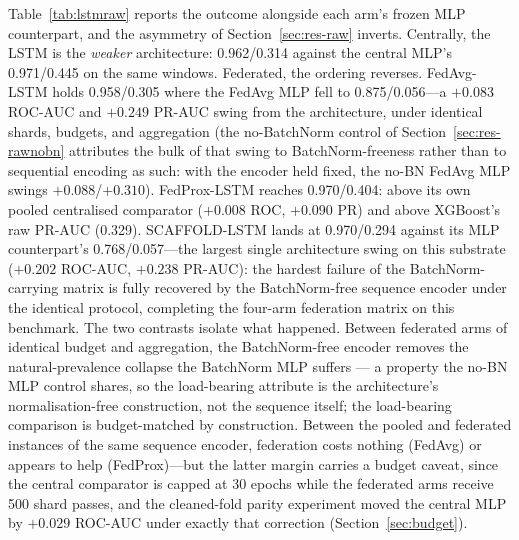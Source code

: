 Table~\ref{tab:lstmraw} reports the outcome alongside each arm's
frozen MLP counterpart, and the asymmetry of
Section~\ref{sec:res-raw} inverts. Centrally, the LSTM is the
\emph{weaker} architecture: 0.962/0.314 against the central MLP's
0.971/0.445 on the same windows. Federated, the ordering reverses.
FedAvg-LSTM holds 0.958/0.305 where the FedAvg MLP fell to
0.875/0.056---a $+0.083$ ROC-AUC and $+0.249$ PR-AUC swing from the
architecture, under identical shards, budgets, and aggregation (the
no-BatchNorm control of Section~\ref{sec:res-rawnobn} attributes the
bulk of that swing to BatchNorm-freeness rather than to sequential
encoding as such: with the encoder held fixed, the no-BN FedAvg MLP
swings $+0.088$/$+0.310$).
FedProx-LSTM reaches 0.970/0.404: above its own pooled centralised
comparator ($+0.008$ ROC, $+0.090$ PR) and above XGBoost's raw
PR-AUC (0.329). SCAFFOLD-LSTM lands at 0.970/0.294 against its MLP
counterpart's 0.768/0.057---the largest single architecture swing on
this substrate ($+0.202$ ROC-AUC, $+0.238$ PR-AUC): the hardest
failure of the BatchNorm-carrying matrix is fully recovered by the
BatchNorm-free sequence encoder under the identical protocol, completing the
four-arm federation matrix on this benchmark. The two contrasts isolate what happened. Between
federated arms of identical budget and aggregation, the
BatchNorm-free encoder removes the natural-prevalence collapse the
BatchNorm MLP suffers --- a property the no-BN MLP control shares,
so the load-bearing attribute is the architecture's normalisation-free
construction, not the sequence itself; the
load-bearing comparison is budget-matched by construction. Between
the pooled and federated instances of the same sequence encoder,
federation costs nothing (FedAvg) or appears to help (FedProx)---but
the latter margin carries a budget caveat, since the central
comparator is capped at 30 epochs while the federated arms receive
500 shard passes, and the cleaned-fold parity experiment moved the
central MLP by $+0.029$ ROC-AUC under exactly that correction
(Section~\ref{sec:budget}).

